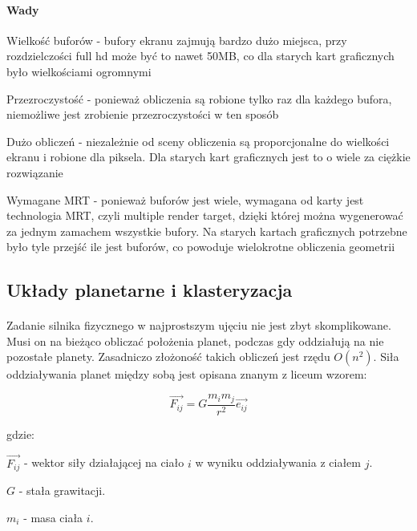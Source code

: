\paragraph{Wady}

\begin{description}
\item{Wielkość buforów} - bufory ekranu zajmują bardzo dużo miejsca, przy rozdzielczości full hd może być to nawet 50MB, co dla starych kart graficznych było wielkościami ogromnymi
\item{Przezroczystość} - ponieważ obliczenia są robione tylko raz dla każdego bufora, niemożliwe jest zrobienie przezroczystości w ten sposób
\item{Dużo obliczeń} - niezależnie od sceny obliczenia są proporcjonalne do wielkości ekranu i robione dla piksela. Dla starych kart graficznych jest to o wiele za ciężkie rozwiązanie
\item{Wymagane MRT} - ponieważ buforów jest wiele, wymagana od karty jest technologia MRT, czyli multiple render target, dzięki której można wygenerować za jednym zamachem wszystkie bufory. Na starych kartach graficznych potrzebne było tyle przejść ile jest buforów, co powoduje wielokrotne obliczenia geometrii
\end{description}

\subsection{Układy planetarne i klasteryzacja}\label{sub:uklady planetarne}

\paragraph{}
Zadanie silnika fizycznego w najprostszym ujęciu nie jest zbyt skomplikowane. Musi on na bieżąco obliczać położenia planet, podczas gdy oddziałują na nie pozostałe planety. Zasadniczo złożoność takich obliczeń jest rzędu \ensuremath{O(n^2)}. Siła oddziaływania planet między sobą jest opisana znanym z liceum wzorem:

		$$ \overrightarrow{F_{ij}} = G\frac{m_i m_j}{r^2}\overrightarrow{e_{ij}}  $$

gdzie: 

$ \overrightarrow{F_{ij}} $ - wektor siły działającej na ciało $i$ w wyniku oddziaływania z ciałem $j$. 

$ G $ - stała grawitacji. 
 
$ m_i $ - masa ciała $i$. 

